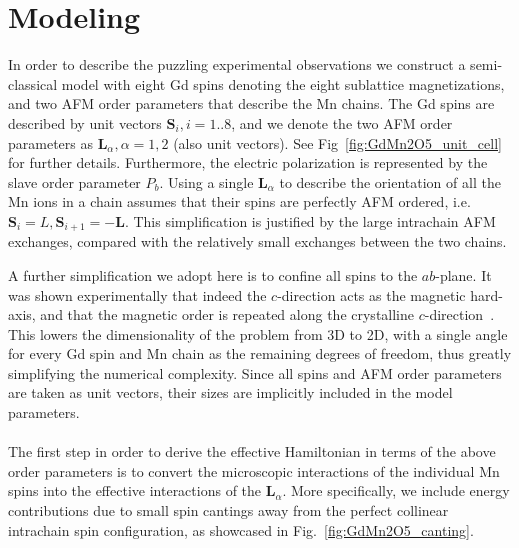 \section{Modeling}
In order to describe the puzzling experimental observations we construct a semi-classical model with eight Gd spins denoting the eight sublattice magnetizations, and two AFM order parameters that describe the Mn chains.
The Gd spins are described by unit vectors $\bm{S}_i, i=1..8$, and we denote the two AFM order parameters as $\bm{L}_\alpha, \alpha=1,2$ (also unit vectors). See Fig~\ref{fig:GdMn2O5_unit_cell} for further details.
Furthermore, the electric polarization is represented by the slave order parameter $P_b$.
Using a single $\bm{L}_\alpha$ to describe the orientation of all the Mn ions in a chain assumes that their spins are perfectly AFM ordered, i.e. $\bm{S}_i = L, \bm{S}_{i+1} = - \bm{L}$.
This simplification is justified by the large intrachain AFM exchanges, compared with the relatively small exchanges between the two chains.

A further simplification we adopt here is to confine all spins to the $ab$-plane.
It was shown experimentally that indeed the $c$-direction acts as the magnetic hard-axis, and that the magnetic order is repeated along the crystalline $c$-direction~\cite{Lee13}.
This lowers the dimensionality of the problem from 3D to 2D, with a single angle for every Gd spin and Mn chain as the remaining degrees of freedom, thus greatly simplifying the numerical complexity.
Since all spins and AFM order parameters are taken as unit vectors, their sizes are implicitly included in the model parameters.
\\\\
The first step in order to derive the effective Hamiltonian in terms of the above order parameters is to convert the microscopic interactions of the individual Mn spins into the effective interactions of the $\bm{L}_\alpha$.
More specifically, we include energy contributions due to small spin cantings away from the perfect collinear intrachain spin configuration, as showcased in Fig.~\ref{fig:GdMn2O5_canting}.

\begin{figure*}[h]
    \centering
	\caption{{\bf Energy contributions due to spin canting.} a) The Zeeman contribution due to the weak ferromagnetic moment along the field (H, red arrow), as a result of the spin canting. b) The contribution due to Heisenberg exchange when previously parallel Mn spins are canted towards a more AFM alignment. This is a direct result of the geometric frustration. The collinear configuration is denoted by the black arrows, with the dashed teal arrows showing the orientation due to the slight canting by the angle $\delta \theta$. \label{fig:GdMn2O5_canting}}
\end{figure*}

